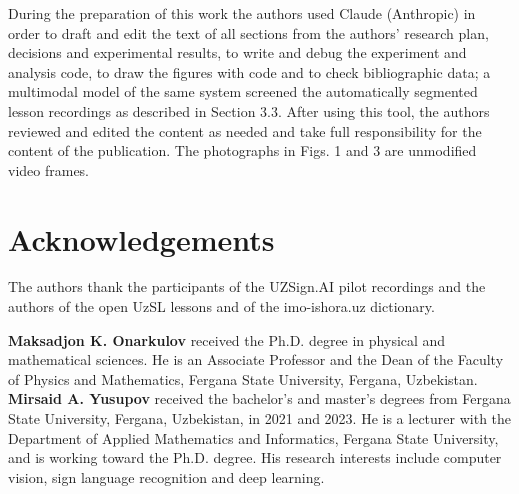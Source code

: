 \documentclass[a4paper,fleqn]{cas-dc}
\begin{document}
During the preparation of this work the authors used Claude (Anthropic) \cite{2026_anthropic_claude} in order to draft and edit the text of all sections from the authors' research plan, decisions and experimental results, to write and debug the experiment and analysis code, to draw the figures with code and to check bibliographic data; a multimodal model of the same system screened the automatically segmented lesson recordings as described in Section 3.3. After using this tool, the authors reviewed and edited the content as needed and take full responsibility for the content of the publication. The photographs in Figs. 1 and 3 are unmodified video frames.

\hypertarget{acknowledgements}{%
\section*{Acknowledgements}\label{acknowledgements}}

The authors thank the participants of the UZSign.AI pilot recordings and the authors of the open UzSL lessons and of the imo-ishora.uz dictionary.



\bio{}
\textbf{Maksadjon K. Onarkulov} received the Ph.D. degree in physical and mathematical sciences. He is an Associate Professor and the Dean of the Faculty of Physics and Mathematics, Fergana State University, Fergana, Uzbekistan.
\endbio
\bio{}
\textbf{Mirsaid A. Yusupov} received the bachelor's and master's degrees from Fergana State University, Fergana, Uzbekistan, in 2021 and 2023. He is a lecturer with the Department of Applied Mathematics and Informatics, Fergana State University, and is working toward the Ph.D. degree. His research interests include computer vision, sign language recognition and deep learning.
\endbio
\end{document}
